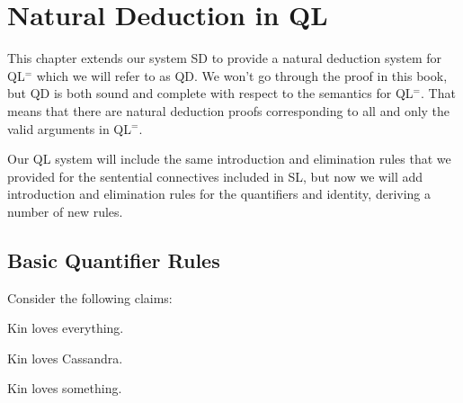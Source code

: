 ﻿%
\chapter{Natural Deduction in QL}
\label{ch.QLND}



This chapter extends our system SD to provide a natural deduction system for QL$^=$ which we will refer to as QD.
We won't go through the proof in this book, but QD is both sound and complete with respect to the semantics for QL$^=$.
That means that there are natural deduction proofs corresponding to all and only the valid arguments in QL$^=$.

Our QL system will include the same introduction and elimination rules that we provided for the sentential connectives included in SL, but now we will add introduction and elimination rules for the quantifiers and identity, deriving a number of new rules.



\section{Basic Quantifier Rules}


Consider the following claims:

\begin{earg}
  \item[\ex{I1}] Kin loves everything.
  \item[\ex{I2}] Kin loves Cassandra.
  \item[\ex{I3}] Kin loves something.
\end{earg}

